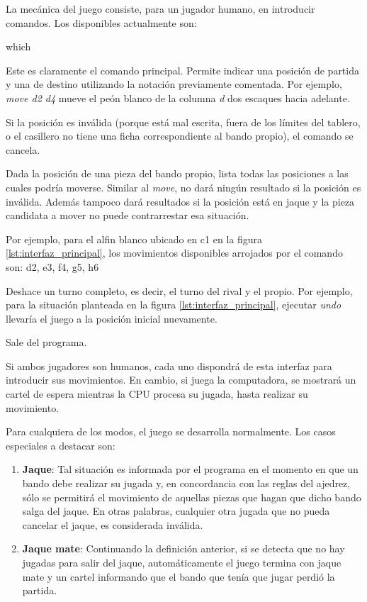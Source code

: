 \documentclass{llncs}
\begin{document}
La mecánica del juego consiste, para un jugador humano, en introducir comandos. Los disponibles actualmente son:
\newline

\begin{labeling}{which}
  \item [move] Este es claramente el comando principal. Permite indicar una posición de partida y una de destino utilizando la notación previamente comentada. Por ejemplo, \textit{move d2 d4} mueve el peón blanco de la columna \textit{d}  dos escaques hacia adelante.

    Si la posición es inválida (porque está mal escrita, fuera de los límites del tablero, o el casillero no tiene una ficha correspondiente al bando propio), el comando se cancela.
  \item[which] Dada la posición de una pieza del bando propio, lista todas las posiciones a las cuales podría moverse. Similar al \textit{move}, no dará ningún resultado si la posición es inválida. Además tampoco dará resultados si la posición está en jaque y la pieza candidata a mover no puede contrarrestar esa situación.

    Por ejemplo, para el alfin blanco ubicado en c1 en la figura \ref{lst:interfaz_principal}, los movimientos disponibles arrojados por el comando son: d2, e3, f4, g5, h6
  \item[undo] Deshace un turno completo, es decir, el turno del rival y el propio. Por ejemplo, para la situación planteada en la figura \ref{lst:interfaz_principal}, ejecutar \textit{undo} llevaría el juego a la posición inicial nuevamente.
  \item[exit] Sale del programa.
\end{labeling}

Si ambos jugadores son humanos, cada uno dispondrá de esta interfaz para introducir sus movimientos. En cambio, si juega la computadora, se mostrará un cartel de espera mientras la CPU procesa su jugada, hasta realizar su movimiento.

Para cualquiera de los modos, el juego se desarrolla normalmente. Los casos especiales a destacar son:

\begin{enumerate}
  \item \textbf{Jaque}: Tal situación es informada por el programa en el momento en que un bando debe realizar su jugada y, en concordancia con las reglas del ajedrez, sólo se permitirá el movimiento de aquellas piezas que hagan que dicho bando salga del jaque. En otras palabras, cualquier otra jugada que no pueda cancelar el jaque, es considerada inválida.
  \item \textbf{Jaque mate}: Continuando la definición anterior, si se detecta que no hay jugadas para salir del jaque, automáticamente el juego termina con jaque mate y un cartel informando que el bando que tenía que jugar perdió la partida.
\end{enumerate}
\end{document}
